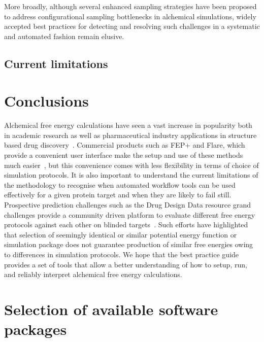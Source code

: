 \documentclass[9pt,bestpractices]{livecoms}
\begin{document}
More broadly, although several enhanced sampling strategies have been proposed to address configurational sampling bottlenecks in alchemical simulations, widely accepted best practices for detecting and resolving such challenges in a systematic and automated fashion remain elusive. 

\subsection{Current limitations}


\section{Conclusions}
\label{sec:conclusion}
Alchemical free energy calculations have seen a vast increase in popularity both in academic research as well as pharmaceutical industry applications in structure based drug discovery~\cite{schindler2020largescale, sherborne2016collaborating, wagner2017computational}. Commercial products such as FEP+ and Flare, which provide a convenient user interface make the setup and use of these methods much easier~\cite{wang2015accurate, kuhn2020assessment}, but this convenience comes with less flexibility in terms of choice of simulation protocols. It is also important to understand the current limitations of the methodology to recognise when automated workflow tools can be used effectively for a given protein target and when they are likely to fail still. Prospective prediction challenges such as the Drug Design Data resource grand challenges provide a community driven platform to evaluate different free energy protocols against each other on blinded targets~\cite{gaieb2018d3r, gaieb2019d3r}. Such efforts have highlighted that selection of seemingly identical or similar potential energy function or simulation package does not guarantee production of similar free energies owing to differences in simulation protocols. 
We hope that the best practice guide provides a set of tools that allow a better understanding of how to setup, run, and reliably interpret alchemical free energy calculations. 

\section{Selection of available software packages}
\end{document}
